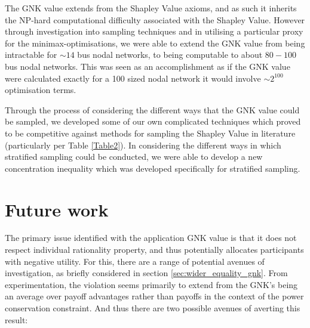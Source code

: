 The GNK value extends from the Shapley Value axioms, and as such it inherits the NP-hard computational difficulty associated with the Shapley Value.
However through investigation into sampling techniques and in utilising a particular proxy for the minimax-optimisations, we were able to extend the GNK value from being intractable for $\sim 14$ bus nodal networks, to being computable to about $80-100$ bus nodal networks.
This was seen as an accomplishment as if the GNK value were calculated exactly for a 100 sized nodal network it would involve $\sim 2^{100}$ optimisation terms.

Through the process of considering the different ways that the GNK value could be sampled, we developed some of our own complicated techniques which proved to be competitive against methods for sampling the Shapley Value in literature (particularly per Table \ref{Table2}).
In considering the different ways in which stratified sampling could be conducted, we were able to develop a new concentration inequality which was developed specifically for stratified sampling.




\section{Future work}
\label{sec:future}

The primary issue identified with the application GNK value is that it does not respect individual rationality property, and thus potentially allocates participants with negative utility. For this, there are a range of potential avenues of investigation, as briefly considered in section \ref{sec:wider_equality_gnk}.
From experimentation, the violation seems primarily to extend from the GNK's being an average over payoff advantages rather than payoffs in the context of the power conservation constraint.
And thus there are two possible avenues of averting this result:

